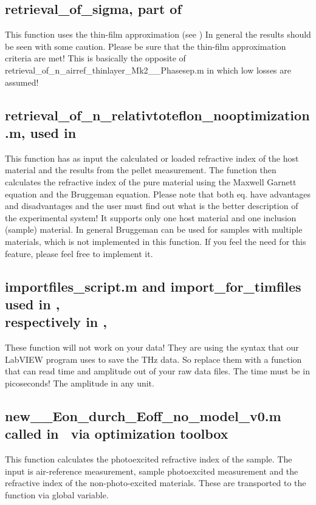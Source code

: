 \documentclass[12pt]{article}
\begin{document}
\subsection{ retrieval\_of\_sigma, part of \TDS}
This function uses the thin-film approximation (see \cite{LiangOct., Nuss1991, Walther2007, thinfilm}) 
In general the results should be seen with some caution. Please be sure that the thin-film approximation criteria are met! This is basically the opposite of retrieval\_of\_n\_airref\_thinlayer\_Mk2\_\_Phasesep.m in which low losses are assumed! 

\subsection{retrieval\_of\_n\_relativtoteflon\_nooptimization.m, used in \pellets}
This function has as input the calculated or loaded refractive index of the host material and the results from the pellet measurement. The function then calculates the refractive index of the pure material using the Maxwell Garnett equation and the Bruggeman equation. Please note that both eq. have advantages and disadvantages and the user must find out what is the better description of the experimental system! It supports only one host material and one inclusion (sample) material. In general Bruggeman can be used for samples with multiple materials, which is not implemented in this function. If you feel the need for this feature, please feel free to implement it.

\subsection{importfiles\_script.m and import\_for\_timfiles used in \TRTS,\\ respectively in \TDS,\Pellet}
These function will not work on your data! They are using the syntax that our LabVIEW program uses to save the THz data. So replace them with a function that can read time and amplitude out of your raw data files. The time must be in picoseconds! The amplitude in any unit. 

\subsection{new\_\_Eon\_durch\_Eoff\_no\_model\_v0.m called in \TRTS~via optimization toolbox}
This function calculates the photoexcited refractive index of the sample. The input is air-reference measurement, sample photoexcited measurement and the refractive index of the non-photo-excited materials. These are transported to the function via global variable.
\end{document}
